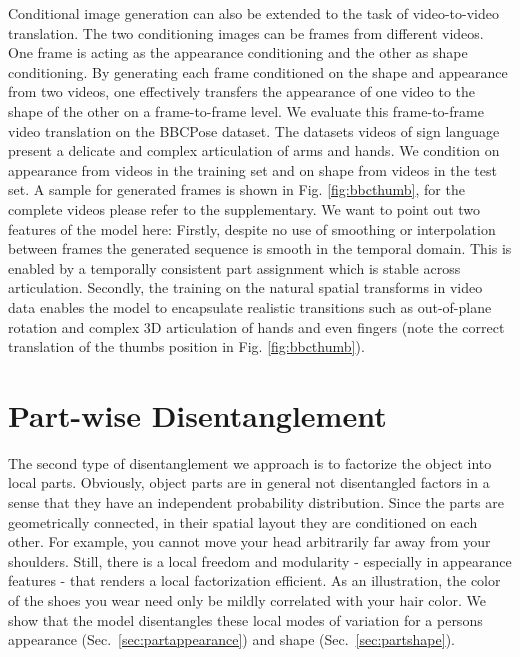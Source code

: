 	Conditional image generation can also be extended to the task of {video-to-video translation}. The two conditioning images can be frames from different videos. One frame is acting as the appearance conditioning and the other as shape conditioning. By generating each frame conditioned on the shape and appearance from two videos, one effectively transfers the appearance of one video to the shape of the other on a frame-to-frame level.
	We evaluate this frame-to-frame video translation on the BBCPose dataset. The datasets videos of sign language present a delicate and complex articulation of arms and hands. We condition on appearance from videos in the training set and on shape from videos in the test set. A sample for generated frames is shown in Fig. \ref{fig:bbcthumb}, for the complete videos please refer to the supplementary.
	We want to point out two features of the model here: Firstly, despite no use of smoothing or interpolation between frames the generated sequence is smooth in the temporal domain. This is enabled by a temporally consistent part assignment which is stable across articulation.
	Secondly, the training on the natural spatial transforms in video data enables the model to encapsulate realistic transitions such as out-of-plane rotation and complex 3D articulation of \eg hands and even fingers (note the correct translation of the thumbs position in Fig. \ref{fig:bbcthumb}). \\

\section{Part-wise Disentanglement}\label{sec:partwise}
	The second type of disentanglement we approach is to factorize the object into local parts. Obviously, object parts are in general not disentangled factors in a sense that they have an independent probability distribution. Since the parts are geometrically connected, in their spatial layout they are conditioned on each other. For example, you cannot move your head arbitrarily far away from your shoulders. Still, there is a local freedom and modularity - especially in appearance features - that renders a local factorization efficient. As an illustration, the color of the shoes you wear need only be mildly correlated with your hair color.
	We show that the model disentangles these local modes of variation for a persons appearance (Sec.~\ref{sec:partappearance}) and shape (Sec.~\ref{sec:partshape}).


